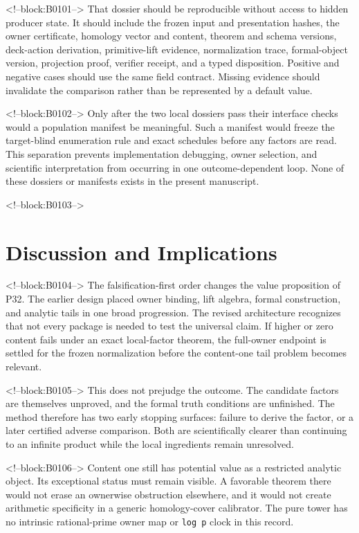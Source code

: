 \documentclass[11pt]{article}
\begin{document}
<!--block:B0101-->
That dossier should be reproducible without access to hidden producer
state. It should include the frozen input and presentation hashes, the
owner certificate, homology vector and content, theorem and schema
versions, deck-action derivation, primitive-lift evidence, normalization
trace, formal-object version, projection proof, verifier receipt, and a
typed disposition. Positive and negative cases should use the same
field contract. Missing evidence should invalidate the comparison
rather than be represented by a default value.

<!--block:B0102-->
Only after the two local dossiers pass their interface checks would a
population manifest be meaningful. Such a manifest would freeze the
target-blind enumeration rule and exact schedules before any factors are
read. This separation prevents implementation debugging, owner
selection, and scientific interpretation from occurring in one
outcome-dependent loop. None of these dossiers or manifests exists in
the present manuscript.

<!--block:B0103-->
\hypertarget{7-discussion-and-implications}{%
\section{Discussion and
Implications}\label{7-discussion-and-implications}}

<!--block:B0104-->
The falsification-first order changes the value proposition of P32. The
earlier design placed owner binding, lift algebra, formal construction,
and analytic tails in one broad progression. The revised architecture recognizes that
not every package is needed to test the universal claim. If higher or
zero content fails under an exact local-factor theorem, the full-owner
endpoint is settled for the frozen normalization before the content-one
tail problem becomes relevant.

<!--block:B0105-->
This does not prejudge the outcome. The candidate factors are themselves
unproved, and the formal truth conditions are unfinished. The method
therefore has two early stopping surfaces: failure to derive the factor,
or a later certified adverse comparison. Both are scientifically clearer
than continuing to an infinite product while the local ingredients
remain unresolved.

<!--block:B0106-->
Content one still has potential value as a restricted analytic object.
Its exceptional status must remain visible. A favorable theorem there
would not erase an ownerwise obstruction elsewhere, and it would not
create arithmetic specificity in a generic homology-cover calibrator.
The pure tower has no intrinsic rational-prime owner map or
\texttt{log\ p} clock in this record.
\end{document}
